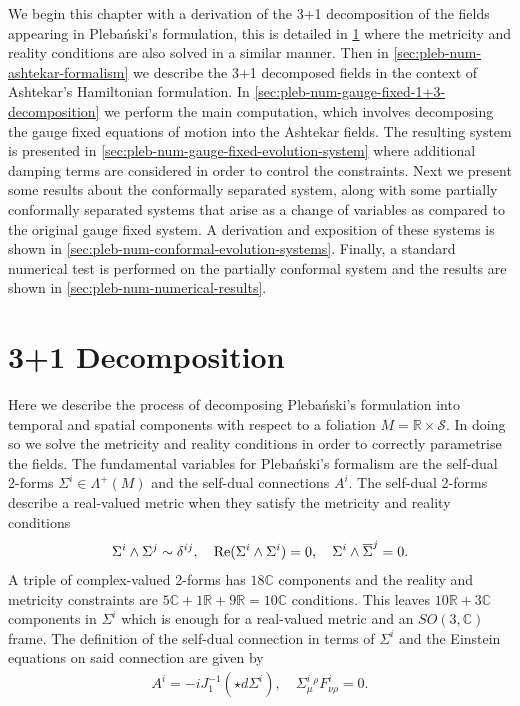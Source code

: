 \documentclass[10pt]{report}
\newcommand{\pleb}[0]{Pleba\'nski}
\theoremstyle{definition}
\newcommand{\R}[0]{\mathbb{R}}
\newcommand{\C}[0]{\mathbb{C}}
\newcommand{\asd}[0]{\overline{\Sigma}}
\newcommand{\spasurf}[0]{\mathcal{S}}
\begin{document}
    We begin this chapter with a derivation of the 3+1 decomposition of the fields appearing in \pleb{}'s formulation, this is detailed in \cref{sec:pleb-num-1+3-decomposition} where the metricity and reality conditions are also solved in a similar manner. Then in \cref{sec:pleb-num-ashtekar-formalism} we describe the 3+1 decomposed fields in the context of Ashtekar's Hamiltonian formulation. In \cref{sec:pleb-num-gauge-fixed-1+3-decomposition} we perform the main computation, which involves decomposing the gauge fixed equations of motion into the Ashtekar fields. The resulting system is presented in \cref{sec:pleb-num-gauge-fixed-evolution-system} where additional damping terms are considered in order to control the constraints. Next we present some results about the conformally separated system, along with some partially conformally separated systems that arise as a change of variables as compared to the original gauge fixed system. A derivation and exposition of these systems is shown in \cref{sec:pleb-num-conformal-evolution-systems}. Finally, a standard numerical test is performed on the partially conformal system and the results are shown in \cref{sec:pleb-num-numerical-results}.

    \section{3+1 Decomposition} \label{sec:pleb-num-1+3-decomposition}

    Here we describe the process of decomposing \pleb{}'s formulation into temporal and spatial components with respect to a foliation $M = \R \times \spasurf$. In doing so we solve the metricity and reality conditions in order to correctly parametrise the fields. The fundamental variables for \pleb{}'s formalism are the self-dual 2-forms $\Sigma^i \in \Lambda^+(M)$ and the self-dual connections $A^i$. The self-dual 2-forms describe a real-valued metric when they satisfy the metricity and reality conditions 
    \begin{align}
        \Sigma^i \wedge \Sigma^j \sim \delta^{ij}, \quad {\rm Re}(\Sigma^i \wedge \Sigma^i) = 0, \quad \Sigma^i \wedge \asd^j = 0.
    \end{align}
    A triple of complex-valued 2-forms has $18\C$ components and the reality and metricity constraints are $5\C + 1\R + 9 \R = 10\C$ conditions. This leaves $10\R + 3\C$ components in $\Sigma^i$ which is enough for a real-valued metric and an $SO(3,\C)$ frame. The definition of the self-dual connection in terms of $\Sigma^i$ and the Einstein equations on said connection are given by
    \begin{align}
        A^i = -i J_1^{-1}(\star d\Sigma^i), \quad \Sigma^i_\mu{}^\rho F^i_{\nu\rho} = 0.
    \end{align}
\end{document}
